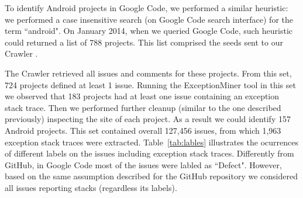 \documentclass[conference]{IEEEtran}
\begin{document}
To identify Android projects in Google Code, we performed a similar heuristic: we performed a case insensitive search 
(on Google Code search interface) for the term ``android". On January 2014, when we queried Google Code, such heuristic could
 returned a list of 788  projects. This list comprised the seeds sent to our Crawler .

The Crawler retrieved all issues and comments for these projects.
From this set, 724 projects defined at least 1 issue. Running the ExceptionMiner tool 
 in this set we observed that 183 projects had at least one issue containing an exception stack trace.
 Then we performed further cleanup (similar to the one described previously) inspecting the site 
of each project. As a result we could identify 157 Android projects.  This set contained overall 127,456 issues,
 from which 1,963 exception stack traces were extracted. Table~\ref{tab:lables} illustrates the ocurrences of different labels 
on the issues including exception stack traces. Differently from GitHub, in Google Code most of 
the issues were labled as ``Defect". However, based on the same assumption described for the GitHub repository
 we considered all issues reporting stacks (regardless its labels).




\end{document}
